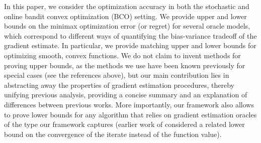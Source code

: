 
In this paper, we consider the optimization accuracy in both the stochastic and online bandit convex optimization (BCO) setting.
We  provide upper and lower bounds on the minimax optimization error (or regret) for several oracle models, which correspond to different ways of quantifying the bias-variance tradeoff of the gradient estimate. In particular, we provide matching upper and lower bounds for optimizing smooth, convex functions. We do not claim to invent methods for proving upper bounds, as the methods we use have been known previously for special cases  (see the references above),
but our main contribution lies in abstracting away the properties of gradient estimation procedures, 
thereby unifying previous analysis, providing a concise summary and an explanation of differences between previous works.
More importantly, our framework also allows to prove lower bounds for any algorithm that relies on gradient
estimation oracles of the type our framework captures
(earlier work of \citealp{Chen88:LB-AoS} considered a related lower bound on the convergence of the iterate instead of the function value).

